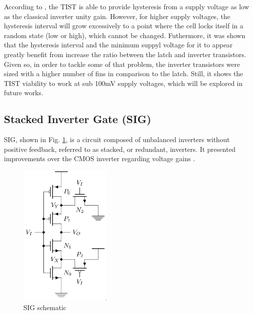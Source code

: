 \documentclass[pgmicro,mestrado,english]{iiufrgs}
\begin{document}
According to \cite{thiagoTIST}, the TIST is able to provide hysteresis from a supply voltage as low as the classical inverter unity gain. However, for higher supply voltages, the hysteresis interval will grow excessively to a point where the cell locks itself in a random state (low or high), which cannot be changed. Futhermore, it was shown that the hysteresis interval and the minimum suppyl voltage for it to appear greatly benefit from increase the ratio between the latch and inverter transistors. Given so, in order to tackle some of that problem, the inverter transistors were sized with a higher number of fins in comparison to the latch. Still, it shows the TIST viability to work at sub 100mV supply voltages, which will be explored in future works.

\subsection{Stacked Inverter Gate (SIG)}

SIG, shown in Fig. \ref{fig:SIG}, is a circuit composed of unbalanced inverters without positive feedback, referred to as stacked, or redundant, inverters. It presented improvements over the CMOS inverter regarding voltage gains \cite{bose2018stacked, luo2017sub}.

\begin{figure}[]
  \centering
    \includegraphics[width=0.4\textwidth]{SIG.png}
     \caption{SIG schematic \cite{bose2018stacked}}
  \label{fig:SIG}
\end{figure}



\end{document}
